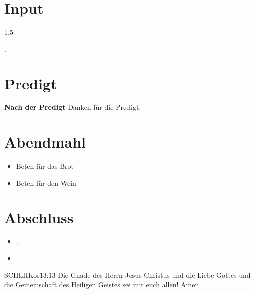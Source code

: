 \documentclass[fontsize=14pt]{mybib}
\begin{document}
\section{ Input }
\begin{spacing}{1.5}
    
    .
\end{spacing}
\section{Predigt}
\textbf{Nach der Predigt}\newline
Danken für die Predigt.
\section{Abendmahl}
\begin{itemize}
    \item [] Beten für das Brot
    \item [] Beten für den Wein
\end{itemize}
\section{Abschluss}
\begin{itemize}
    \item [] .
    \item [] 
\end{itemize}
\begin{bibelbox}{SCHL}{IIKor}{13:13}
    Die Gnade des Herrn Jesus Christus und die Liebe Gottes und die Gemeinschaft des Heiligen Geistes sei mit euch allen! Amen
\end{bibelbox}
\end{document}
